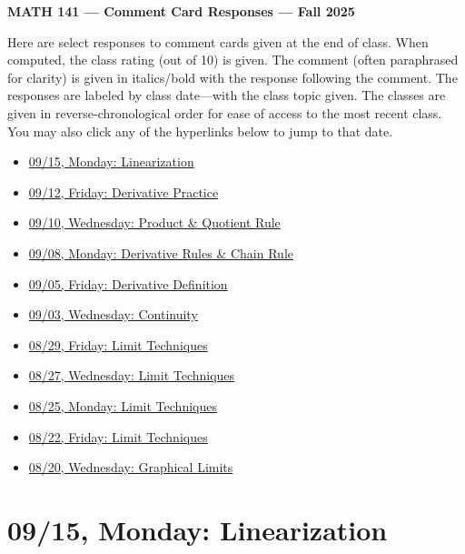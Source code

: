 \documentclass[11pt,letterpaper]{article}
\begin{document}
\begin{center} {\bfseries \LARGE MATH 141 --- Comment Card Responses --- Fall 2025} \end{center}

Here are select responses to comment cards given at the end of class. When computed, the class rating (out of 10) is given. The comment (often paraphrased for clarity) is given in italics/bold with the response following the comment. The responses are labeled by class date---with the class topic given. The classes are given in reverse-chronological order for ease of access to the most recent class. You may also click any of the hyperlinks below to jump to that date.

\begin{itemize}
\item \hyperref[09-15]{09/15, Monday: Linearization}
\item \hyperref[09-12]{09/12,  Friday: Derivative Practice}
\item \hyperref[09-10]{09/10, Wednesday: Product \& Quotient Rule}
\item \hyperref[09-08]{09/08, Monday: Derivative Rules \& Chain Rule}
\item \hyperref[09-05]{09/05, Friday: Derivative Definition}
\item \hyperref[09-03]{09/03, Wednesday: Continuity}
\item \hyperref[08-29]{08/29, Friday: Limit Techniques}
\item \hyperref[08-27]{08/27, Wednesday: Limit Techniques}
\item \hyperref[08-25]{08/25, Monday: Limit Techniques}
\item \hyperref[08-22]{08/22, Friday: Limit Techniques}
\item \hyperref[08-20]{08/20, Wednesday: Graphical Limits}
\end{itemize}

\newpage
\section*{09/15, Monday: Linearization\label{09-15}}
\end{document}
